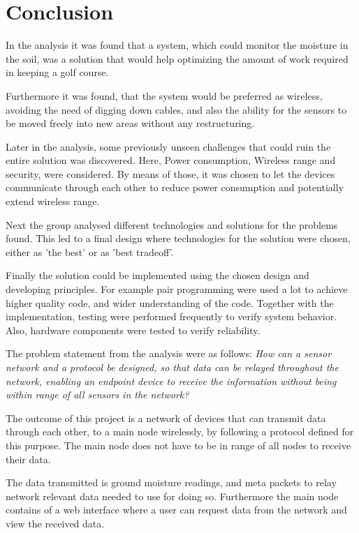 \section{Conclusion}
In the analysis it was found that a system, which could monitor the moisture in the soil, was a solution that would help optimizing the amount of work required in keeping a golf course.

Furthermore it was found, that the system would be preferred as wireless, avoiding the need of digging down cables, and also the ability for the sensors to be moved freely into new areas without any restructuring.

Later in the analysis, some previously unseen challenges that could ruin the entire solution was discovered. Here, Power consumption, Wireless range and security, were considered. By means of those, it was chosen to let the devices communicate through each other to reduce power consumption and potentially extend wireless range.

Next the group analysed different technologies and solutions for the problems found. This led to a final design where technologies for the solution were chosen, either as 'the best' or as 'best tradeoff'.

Finally the solution could be implemented using the chosen design and developing principles. For example pair programming were used a lot to achieve higher quality code, and wider understanding of the code. Together with the implementation, testing were performed frequently to verify system behavior. Also, hardware components were tested to verify reliability.

The problem statement from the analysis were as follows:
\textit{How can a sensor network and a protocol be designed, so that data can be relayed throughout the network, enabling an endpoint device to receive the information without being within range of all sensors in the network?}

The outcome of this project is a network of devices that can transmit data through each other, to a main node wirelessly, by following a protocol defined for this purpose. The main node does not have to be in range of all nodes to receive their data.

The data transmitted is ground moisture readings, and meta packets to relay network relevant data needed to use for doing so. Furthermore the main node contains of a web interface where a user can request data from the network and view the received data.
